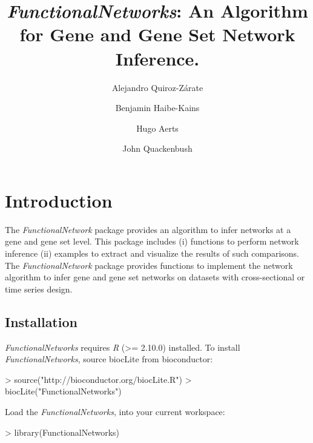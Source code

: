 \documentclass[12pt]{article}
\newcommand{\Rpackage}[1]{\textit{#1}}
\begin{document}


\title{\vspace{-2cm}\Rpackage{FunctionalNetworks}: An Algorithm for Gene and Gene Set Network Inference.}
\author[1]{Alejandro Quiroz-Z\'{a}rate}
\author[2]{Benjamin Haibe-Kains}
\author[3]{Hugo Aerts}
\author[1]{John Quackenbush}





\maketitle
\tableofcontents

\clearpage
\section{Introduction}
The \Rpackage{FunctionalNetwork} package provides an algorithm to infer networks at a gene and gene set level. This package includes (i) functions to perform network inference (ii) examples to extract and visualize the results of such comparisons.\\
The \Rpackage{FunctionalNetwork} package provides functions to implement the network algorithm to infer gene and gene set networks on datasets with cross-sectional or time series design.
\subsection{Installation}
\Rpackage{FunctionalNetworks} requires \Rpackage{R} (>= 2.10.0) installed. To install 	 	
\Rpackage{FunctionalNetworks}, source biocLite from bioconductor:
\begin{Schunk}
\begin{Sinput}
> source("http://bioconductor.org/biocLite.R")
> biocLite("FunctionalNetworks")
\end{Sinput}
\end{Schunk}
Load the \Rpackage{FunctionalNetworks}, into your current workspace:
\begin{Schunk}
\begin{Sinput}
> library(FunctionalNetworks)
\end{Sinput}
\end{Schunk}
\end{document}
